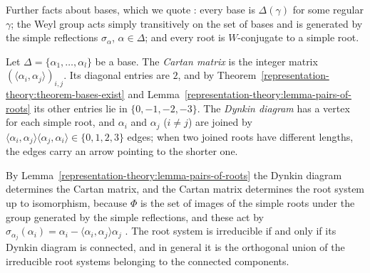 Further facts about bases, which we quote \cite[Sections 10.1 and 10.3]{humphreys-lie}: every base is $\Delta(\gamma)$ for some regular $\gamma$; the Weyl group acts simply transitively on the set of
bases and is generated by the simple reflections $\sigma_\alpha$, $\alpha \in \Delta$; and every root is $W$-conjugate to a simple root.

\begin{definition}\label{representation-theory:definition-cartan-matrix}
Let $\Delta = \{\alpha_1, \ldots, \alpha_l\}$ be a base. The \emph{Cartan matrix} is the integer matrix $(\langle\alpha_i, \alpha_j\rangle)_{i,j}$. Its diagonal entries are $2$, and by
Theorem~\ref{representation-theory:theorem-bases-exist} and Lemma~\ref{representation-theory:lemma-pairs-of-roots} its other entries lie in $\{0, -1, -2, -3\}$. The \emph{Dynkin diagram}
has a vertex for each simple root, and $\alpha_i$ and $\alpha_j$ ($i \neq j$) are joined by $\langle\alpha_i, \alpha_j\rangle\langle\alpha_j, \alpha_i\rangle \in \{0, 1, 2, 3\}$ edges;
when two joined roots have different lengths, the edges carry an arrow pointing to the shorter one.
\end{definition}

By Lemma~\ref{representation-theory:lemma-pairs-of-roots} the Dynkin diagram determines the Cartan matrix, and the Cartan matrix determines the root system up to isomorphism, because
$\Phi$ is the set of images of the simple roots under the group generated by the simple reflections, and these act by $\sigma_{\alpha_j}(\alpha_i) = \alpha_i - \langle\alpha_i,
\alpha_j\rangle\alpha_j$ \cite[Section 11.1]{humphreys-lie}. The root system is irreducible if and only if its Dynkin diagram is connected, and in general it is the orthogonal union of the
irreducible root systems belonging to the connected components.

